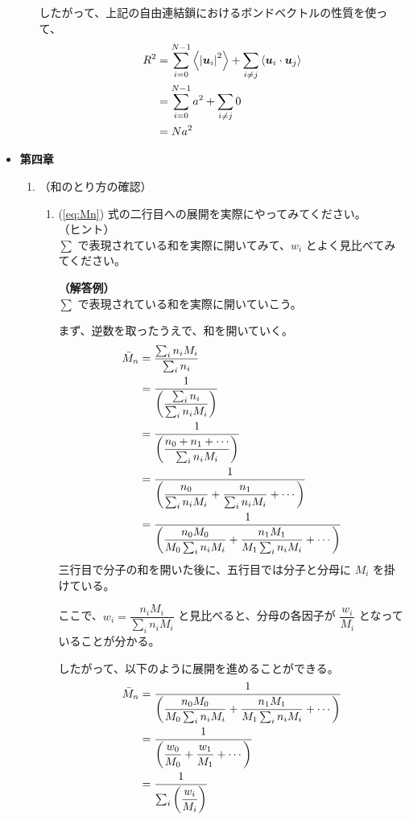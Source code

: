 \documentclass[uplatex,dvipdfmx,a4paper,11pt, titlepage]{jsarticle}
\begin{document}
\begin{itemize}
\begin{enumerate}
	したがって、上記の自由連結鎖におけるボンドベクトルの性質を使って、
	\begin{align*}
	R^2
	&=\sum_{i=0}^{N-1} \left\langle \left|\bm{u}_i \right|^2 \right\rangle 
	+\sum_{i \neq j} \left\langle \bm{u}_i \cdot \bm{u}_j \right\rangle \notag \\
	&=\sum_{i=0}^{N-1} a^2 + \sum_{i \neq j} 0 \notag \\
	&= N a^2
	\end{align*}
	\end{enumerate}

\item
{\bf 第四章}
	\begin{enumerate}
	\item
	（和のとり方の確認）\\
		\vspace{-5mm}
		\begin{enumerate}
		\item
		(\ref{eq:Mn}) 式の二行目への展開を実際にやってみてください。\\
		（ヒント）\\
		$\sum$ で表現されている和を実際に開いてみて、$w_i$ とよく見比べてみてください。

		{\bf（解答例）}\\
		$\sum$ で表現されている和を実際に開いていこう。

		まず、逆数を取ったうえで、和を開いていく。
		\begin{align*}
		{\bar M}_n 
			&= \dfrac{\sum_i n_i M_i}{\sum_i n_i} \notag \\
			&= \dfrac{1}{\left( \dfrac{\sum_i n_i}{\sum_i n_i M_i} \right)} \notag \\
			&= \dfrac{1}{\left(\dfrac{n_0 + n_1 + \cdots}{\sum_i n_i M_i} \right)} \notag \\
			&= \dfrac{1}{\left(\dfrac{n_0 }{\sum_i n_i M_i} + \dfrac{n_1}{\sum_i n_i M_i} + \cdots \right)} \notag \\
			&= \dfrac{1}{\left(\dfrac{n_0 M_0}{M_0 \sum_i n_i M_i} + \dfrac{n_1 M_1}{M_1\sum_i n_i M_i} + \cdots \right)}
		\end{align*}
		三行目で分子の和を開いた後に、五行目では分子と分母に $M_i$ を掛けている。

		ここで、$w_i =\dfrac{n_i M_i}{\sum_i n_i M_i}$ と見比べると、分母の各因子が $\dfrac{w_i}{M_i}$ となっていることが分かる。

		したがって、以下のように展開を進めることができる。
		\begin{align*}
		{\bar M}_n 
			&= \dfrac{1}{\left(\dfrac{n_0 M_0}{M_0 \sum_i n_i M_i} + \dfrac{n_1 M_1}{M_1\sum_i n_i M_i} + \cdots \right)} \notag \\
			&= \dfrac{1}{\left(\dfrac{w_0}{M_0} + \dfrac{w_1}{M_1} + \cdots \right)} \notag \\
			&= \dfrac{1}{\sum_i \left(\dfrac{w_i}{M_i} \right)}
		\end{align*}


\end{enumerate}
\end{enumerate}
\end{itemize}
\end{document}
